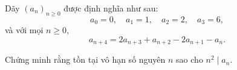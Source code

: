 \ifshowproblem
\begin{problem}\label{example:BMO-2015-P2}
    Dãy \( (a_n)_{n \geq 0} \) được định nghĩa như sau:
    \[
        a_0 = 0,\quad a_1 = 1,\quad a_2 = 2,\quad a_3 = 6,
    \]
    và với mọi \( n \geq 0 \),
    \[
        a_{n+4} = 2a_{n+3} + a_{n+2} - 2a_{n+1} - a_n.
    \]
    
    Chứng minh rằng tồn tại vô hạn số nguyên \( n \) sao cho \( n^2 \mid a_n \).
\end{problem}
\fi

\footnotemark
{}
\fi